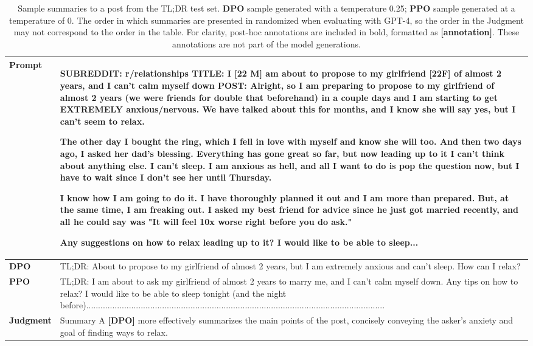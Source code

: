 \documentclass{article}
\begin{document}
\begin{table}
    \centering
    \begin{tabular}{lp{11.5cm}}
        \toprule
        \textbf{Prompt} & SUBREDDIT: r/relationships
        TITLE: I [22 M] am about to propose to my girlfriend [22F] of almost 2 years, and I can't calm myself down
        POST: Alright, so I am preparing to propose to my girlfriend of almost 2 years
        (we were friends for double that beforehand) in a couple days and I am starting to get EXTREMELY anxious/nervous. We have talked about this for months, and I know she will say yes, but I can't seem to relax.

        The other day I bought the ring, which I fell in love with myself and know she will too. And then two days ago, I asked her dad's blessing. Everything has gone great so far, but now leading up to it I can't think about anything else. I can't sleep. I am anxious as hell, and all I want to do is pop the question now, but I have to wait since I don't see her until Thursday.

        I know how I am going to do it. I have thoroughly planned it out and I am more than prepared. But, at the same time, I am freaking out. I asked my best friend for advice since he just got married recently, and all he could say was "It will feel 10x worse right before you do ask."

        Any suggestions on how to relax leading up to it? I would like to be able to sleep... \\
        \midrule
        \textbf{DPO} & TL;DR: About to propose to my girlfriend of almost 2 years, but I am extremely anxious and can't sleep. How can I relax?\\
        \midrule
        \textbf{PPO} & TL;DR: I am about to ask my girlfriend of almost 2 years to marry me, and I can't calm myself down. Any tips on how to relax? I would like to be able to sleep tonight (and the night before).............................................................................................................................. \\
        \midrule
        \textbf{Judgment} & Summary A \textbf{[DPO]} more effectively summarizes the main points of the post, concisely conveying the asker's anxiety and goal of finding ways to relax. \\
        \bottomrule
    \end{tabular}
    \vspace{4mm}
    \caption{Sample summaries to a post from the TL;DR test set. \textbf{DPO} sample generated with a temperature 0.25; \textbf{PPO} sample generated at a temperature of 0. The order in which summaries are presented in randomized when evaluating with GPT-4, so the order in the Judgment may not correspond to the order in the table. For clarity, post-hoc annotations are included in bold, formatted as \textbf{[annotation]}. These annotations are not part of the model generations.}
    \label{tab:summ-ex-2}
\end{table}
\end{document}
